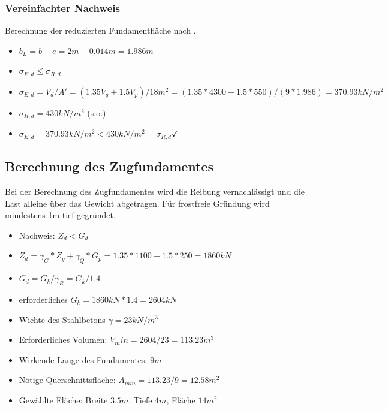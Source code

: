 \documentclass[11pt,fleqn,a4paper,halfparskip]{article}
\begin{document}
\subsubsection{Vereinfachter Nachweis}
Berechnung der reduzierten Fundamentfläche nach \cite[S.108]{wsp}.
\begin{itemize}
\item[] $b_L = b - e = 2m-0.014m = 1.986m$
\item[] $\sigma_{E,d} \le \sigma_{R,d}$
\item[] $\sigma_{E,d} = V_d/A' = (1.35V_g + 1.5V_p) / 18m^2 = (1.35*4300 + 1.5*550)/(9*1.986) = 370.93kN/m^2$
\item[] $\sigma_{R,d} = 430kN/m^2$ (s.o.)
\item[] $\sigma_{E,d} = 370.93kN/m^2 < 430kN/m^2 = \sigma_{R,d}\checkmark$
\end{itemize}
\subsection{Berechnung des Zugfundamentes}
Bei der Berechnung des Zugfundamentes wird die Reibung vernachlässigt und die Last alleine über das Gewicht abgetragen. Für frostfreie Gründung wird mindestens 1m tief gegründet.
\begin{itemize}
\item[] Nachweis: $Z_d <  G_d$
\item[] $Z_d = \gamma_G*Z_g + \gamma_Q*G_p = 1.35*1100 + 1.5*250 = 1860kN$
\item[] $G_d = G_k/\gamma_R = G_k/1.4$
\item[] erforderliches $G_k = 1860kN*1.4 = 2604kN$
\item[] Wichte des Stahlbetons $\gamma = 23kN/m^3$
\item[] Erforderliches Volumen: $V_min = 2604/23 = 113.23m^3$
\item[] Wirkende Länge des Fundamentes: $9m$
\item[] Nötige Querschnittsfläche: $A_{min} = 113.23/9 = 12.58m^2$
\item[] Gewählte Fläche: Breite $3.5m$, Tiefe $4m$, Fläche $14m^2$
\end{itemize}
\end{document}
